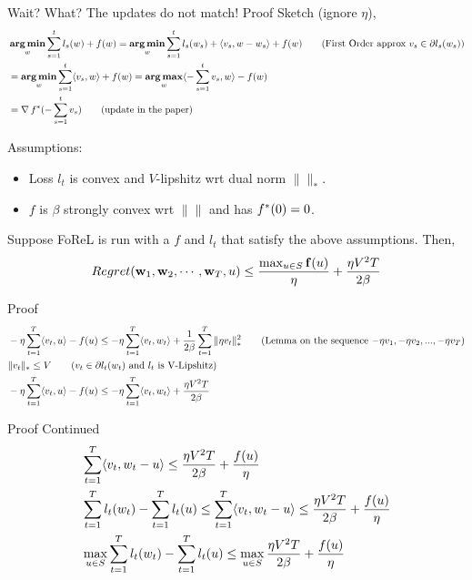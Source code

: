 \begin{frame}{Wait? What? The updates do not match!}
  Proof Sketch (ignore $\eta$),
  \begin{align*}
   & \operatorname*{\mathbf{arg\,min}}_w \sum_{s=1}^t l_s(w) + f(w) = \operatorname*{\mathbf{arg\,min}}_w \sum_{s=1}^t l_s(w_s)+\langle {v_s} , {w-w_s} \rangle + f(w) \tag{First Order approx $v_s \in  \partial l_s(w_s)$} \\
    &= \operatorname*{\mathbf{arg\,min}}_w \sum_{s=1}^t \langle {v_s} , {w} \rangle + f(w) = \operatorname*{\mathbf{arg\,max}}_w \langle {-\sum_{s=1}^t v_s} , {w} \rangle -f(w) \\
    &= \operatorname{\nabla} {f}^{*}(-\sum_{s=1}^t v_s) \tag{update in the paper}
  \end{align*}
\end{frame}
\begin{frame}
  Assumptions:
  \begin{itemize}
  \item Loss $l_t$ is convex and $V$-lipshitz wrt dual norm $\|\|_{*}$.
  \item $f$ is $\beta$ strongly convex wrt $\|\|$ and has ${f}^{*}(0)=0$.
  \end{itemize}

  \begin{theorem}
    Suppose FoReL is run with a $f$ and $l_t$ that satisfy the above assumptions. Then,
    \begin{align*}    
      Regret(\operatorname{\mathbf{w}}_1,\operatorname{\mathbf{w}}_2,\cdots,\operatorname{\mathbf{w}}_T,u) \le \frac{\max_{u \in S} \operatorname{\mathbf{f}}(u)}{\eta} + \frac{\eta V^2T}{2\beta}
    \end{align*}  
  \end{theorem}
\end{frame}

\begin{frame}{Proof}
    \begin{align*}    
      & -\eta\sum_{t=1}^T \langle {v_t} , {u} \rangle -f(u) \le -\eta\sum_{t=1}^T \langle {v_t} , {w_t} \rangle +\frac{1}{2\beta} \sum_{t=1}^T \|\eta v_t\|_{*}^2 \tag{Lemma on the sequence $-\eta v_1,-\eta v_2,...,-\eta v_T$}\\
      & \|v_t\|_{*} \le V \tag{$v_t \in \partial l_t(w_t)$ and $l_t$ is V-Lipshitz} \\
      & -\eta\sum_{t=1}^T \langle {v_t} , {u} \rangle -f(u) \le -\eta\sum_{t=1}^T \langle {v_t} , {w_t} \rangle +\frac{\eta V^2T}{2\beta} \\
    \end{align*}
\end{frame}

\begin{frame}{Proof Continued}
    \begin{align*}    
      & \sum_{t=1}^T \langle {v_t} , {w_t - u} \rangle \le \frac{\eta V^2T}{2\beta} + \frac{f(u)}{\eta} \\
      & \sum_{t=1}^T l_t(w_t) - \sum_{t=1}^T l_t(u) \le \sum_{t=1}^T \langle {v_t} , {w_t - u} \rangle \le \frac{\eta V^2T}{2\beta} + \frac{f(u)}{\eta} \\
      & \max_{u \in S} \sum_{t=1}^T l_t(w_t) - \sum_{t=1}^T l_t(u) \le \max_{u \in S} \frac{\eta V^2T}{2\beta} + \frac{f(u)}{\eta}
    \end{align*}  
\end{frame}


